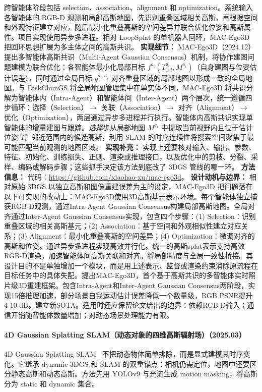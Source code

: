 跨智能体阶段包括 selection、association、alignment 和 optimization。系统输入各智能体的 RGB-D 观测和局部高斯地图，先识别重叠区域相关高斯，再根据空间和外观特征建立对应，随后最小化重叠高斯的空间差异并联合优化位姿和高斯属性。项目实现使用异步多进程。相对 LoopSplat 的单机器人回环，MAC-Ego3D 把回环思想扩展为多主体之间的高斯共识。
\textbf{实现细节：} MAC-Ego3D（2024.12） 提出多智能体高斯共识（Multi-Agent Gaussian Consensus）机制，将协作建图问题建模为联合优化：各智能体最小化局部目标 $f^{a_i}(T_{1:t}^{a_i}, M^{a_i})$（自身建图与位姿估计误差），同时通过全局目标 $g^{a_i,a_j}$ 对齐重叠区域的局部地图以形成一致的全局地图。与 DiskChunGS 将全局地图管理集中在单实体不同，MAC-Ego3D 将共识分解为智能体内（Intra-Agent）和智能体间（Inter-Agent）两个层次，统一遵循四步循环：选择（Selection）$\to$ 关联（Association）$\to$ 对齐（Alignment）$\to$ 优化（Optimization），两层通过异步多进程并行执行。智能体内高斯共识实现单智能体的增量建图与跟踪。\textit{选择}步从局部地图 $M^{a_i}$ 中提取当前视野内且位于估计位姿 $T_k^{a_i}$ 邻近范围内的候选高斯，利用 SLAM 的时序连续性将搜索空间聚焦于最可能匹配当前观测的地图区域。
\textbf{实现补充：} 实现上还要核对输入、输出、参数、特征、初始化、训练损失、正则、渲染或推理接口，以及优化中的剪枝、分裂、采样、编码或解码步骤；这些抓手决定该方法到底改了 3DGS 管线的哪一环。
\textbf{方法信息：} 代码：\url{https://github.com/xiaohao-xu/mac-ego3d}。
\textbf{设计动机与边界：} 相对原始 3DGS 以独立高斯和图像重建误差为主的设定，MAC-Ego3D 把问题落在以下可实现的改动上：MAC-Ego3D使用3D高斯基元表示环境。每个智能体独立捕获RGB-D观测，通过Intra-Agent Gaussian Consensus构建局部高斯地图。全局对齐通过Inter-Agent Gaussian Consensus实现，包含四个步骤：(1) Selection：识别重叠区域的相关高斯基元；(2) Association：基于空间和外观相似性建立对应关系；(3) Alignment：最小化重叠高斯的空间差异；(4) Optimization：微调对齐的高斯和位姿。通过异步多进程实现高效并行化。统一的高斯splat表示支持高效RGB-D渲染，加速智能体间高斯关联和对齐。将局部精度与全局一致性桥接。其设计目的不是单独增加一个模块，而是用上述表示、监督或渲染约束消除原流程在目标任务中的具体失配。提出MAC-Ego3D，首个基于高斯共识的多智能体实时照片级3D重建框架。包含Intra-Agent和Inter-Agent Gaussian Consensus两阶段，实现15倍推理加速，部分场景自我运动估计误差降低一个数量级，RGB PSNR提升4-10 dB。建立新SOTA。适用时还应保留论文给出的边界：依赖RGB-D输入；通信开销随智能体数量增加；对动态场景处理能力有限。
\paragraph{4D Gaussian Splatting SLAM（动态对象的四维高斯辐射场）（2025.03）}
4D Gaussian Splatting SLAM~\cite{2503_16710} 不把动态物体简单排除，而是显式建模其时序变化。它继承 dynamic 3DGS 和 SLAM 的双重锚点：相机仍需定位，地图中还要区分静态高斯和动态高斯。方法先用 YOLOv9 与光流生成 motion masking，将高斯分为 static 和 dynamic 集合。

